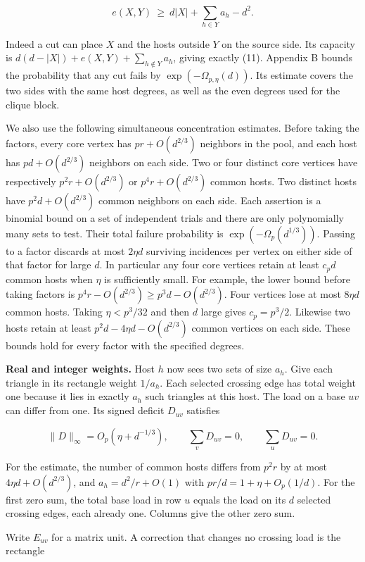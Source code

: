 \documentclass[english,11pt,a4paper]{article}
\begin{document}
\[e(X,Y)\ \ge\ d|X|+\sum_{h\in Y}a_h-d^2.
\tag{11}\]

Indeed a cut can place \(X\) and the hosts outside \(Y\) on the source side. Its capacity is \(d(d-|X|)+e(X,Y)+\sum_{h\notin Y}a_h\), giving exactly (11). Appendix B bounds the probability that any cut fails by \(\exp(-\Omega_{p,\eta}(d))\). Its estimate covers the two sides with the same host degrees, as well as the even degrees used for the clique block.

We also use the following simultaneous concentration estimates. Before taking the factors, every core vertex has \(pr+O(d^{2/3})\) neighbors in the pool, and each host has \(pd+O(d^{2/3})\) neighbors on each side. Two or four distinct core vertices have respectively \(p^2r+O(d^{2/3})\) or \(p^4r+O(d^{2/3})\) common hosts. Two distinct hosts have \(p^2d+O(d^{2/3})\) common neighbors on each side. Each assertion is a binomial bound on a set of independent trials and there are only polynomially many sets to test. Their total failure probability is \(\exp(-\Omega_p(d^{1/3}))\). Passing to a factor discards at most \(2\eta d\) surviving incidences per vertex on either side of that factor for large \(d\). In particular any four core vertices retain at least \(c_p d\) common hosts when \(\eta\) is sufficiently small. For example, the lower bound before taking factors is \(p^4r-O(d^{2/3})\ge p^3d-O(d^{2/3})\). Four vertices lose at most \(8\eta d\) common hosts. Taking \(\eta<p^3/32\) and then \(d\) large gives \(c_p=p^3/2\). Likewise two hosts retain at least \(p^2d-4\eta d-O(d^{2/3})\) common vertices on each side. These bounds hold for every factor with the specified degrees.

\textbf{Real and integer weights.} Host \(h\) now sees two sets of size \(a_h\). Give each triangle in its rectangle weight \(1/a_h\). Each selected crossing edge has total weight one because it lies in exactly \(a_h\) such triangles at this host. The load on a base \(uv\) can differ from one. Its signed deficit \(D_{uv}\) satisfies

\[\|D\|_\infty=O_p(\eta+d^{-1/3}),\qquad
\sum_vD_{uv}=0,\qquad\sum_uD_{uv}=0 .\]

For the estimate, the number of common hosts differs from \(p^2r\) by at most \(4\eta d+O(d^{2/3})\), and \(a_h=d^2/r+O(1)\) with \(pr/d=1+\eta+O_p(1/d)\). For the first zero sum, the total base load in row \(u\) equals the load on its \(d\) selected crossing edges, each already one. Columns give the other zero sum.

Write \(E_{uv}\) for a matrix unit. A correction that changes no crossing load is the rectangle
\end{document}
